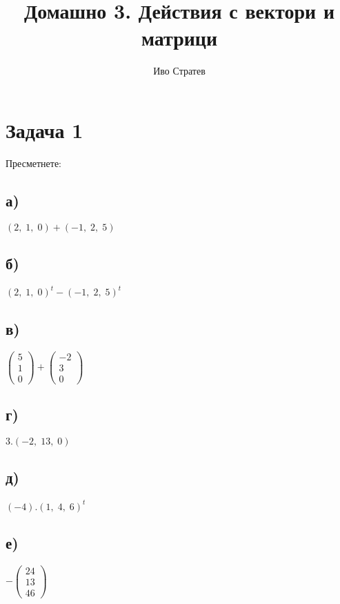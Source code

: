 \documentclass[12pt]{article}
\title{Домашно 3. Действия с вектори и матрици}
\author{Иво Стратев}
\begin{document}
\maketitle

\section*{Задача 1}

Пресметнете:

\subsection*{а)}

$(2, \; 1, \; 0) + (-1, \; 2, \; 5)$

\subsection*{б)}

$(2, \; 1, \; 0)^t - (-1, \; 2, \; 5)^t$

\subsection*{в)}

$\begin{pmatrix} 5 \\ 1 \\ 0 \end{pmatrix} + \begin{pmatrix} -2 \\ 3 \\ 0 \end{pmatrix}$

\subsection*{г)}
    
$3.(-2, \; 13, \; 0)$
    
\subsection*{д)}
    
$(-4).(1, \; 4, \; 6)^t$
    
\subsection*{е)}
    
$-\begin{pmatrix} 24 \\ 13 \\ 46 \end{pmatrix}$
\end{document}
